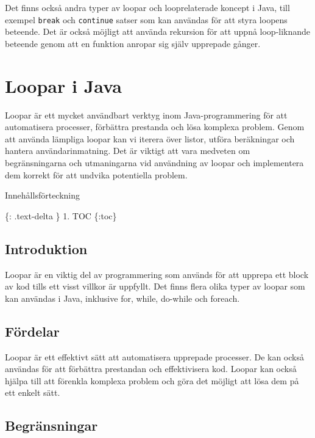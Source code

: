 Det finns också andra typer av loopar och looprelaterade koncept i Java,
till exempel \texttt{break} och \texttt{continue} satser som kan
användas för att styra loopens beteende. Det är också möjligt att
använda rekursion för att uppnå loop-liknande beteende genom att en
funktion anropar sig själv upprepade gånger.

\hypertarget{loopar-i-java}{%
\section{Loopar i Java}\label{loopar-i-java}}

Loopar är ett mycket användbart verktyg inom Java-programmering för att
automatisera processer, förbättra prestanda och lösa komplexa problem.
Genom att använda lämpliga loopar kan vi iterera över listor, utföra
beräkningar och hantera användarinmatning. Det är viktigt att vara
medveten om begränsningarna och utmaningarna vid användning av loopar
och implementera dem korrekt för att undvika potentiella problem.

Innehållsförteckning

\{: .text-delta \} 1. TOC \{:toc\}

\hypertarget{introduktion}{%
\subsection{Introduktion}\label{introduktion}}

Loopar är en viktig del av programmering som används för att upprepa ett
block av kod tills ett visst villkor är uppfyllt. Det finns flera olika
typer av loopar som kan användas i Java, inklusive for, while, do-while
och foreach.

\hypertarget{fuxf6rdelar}{%
\subsection{Fördelar}\label{fuxf6rdelar}}

Loopar är ett effektivt sätt att automatisera upprepade processer. De
kan också användas för att förbättra prestandan och effektivisera kod.
Loopar kan också hjälpa till att förenkla komplexa problem och göra det
möjligt att lösa dem på ett enkelt sätt.

\hypertarget{begruxe4nsningar}{%
\subsection{Begränsningar}\label{begruxe4nsningar}}


